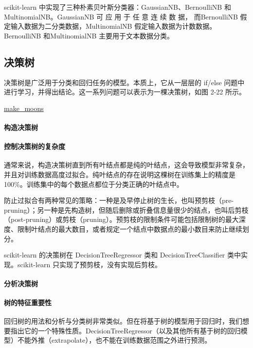 scikit-learn 中实现了三种朴素贝叶斯分类器：GaussianNB、BernoulliNB 和 MultinomialNB。GaussianNB 可 应 用 于 任 意 连 续 数 据， 而BernoulliNB 假定输入数据为二分类数据，MultinomialNB 假定输入数据为计数数据。BernoulliNB 和MultinomialNB 主要用于文本数据分类。

\subsection{决策树}
决策树是广泛用于分类和回归任务的模型。本质上，它从一层层的 if/else 问题中进行学习，并得出结论。这一系列问题可以表示为一棵决策树，如图 2-22 所示。

\href{https://scikit-learn.org/stable/modules/generated/sklearn.datasets.make_moons.html}{make\_moons}

\paragraph{构造决策树}

\paragraph{控制决策树的复杂度} 通常来说，构造决策树直到所有叶结点都是纯的叶结点，这会导致模型非常复杂，并且对训练数据高度过拟合。纯叶结点的存在说明这棵树在训练集上的精度是 100\%。训练集中的每个数据点都位于分类正确的叶结点中。

防止过拟合有两种常见的策略：一种是及早停止树的生长，也叫预剪枝（pre-pruning）；另一种是先构造树，但随后删除或折叠信息量很少的结点，也叫后剪枝（post-pruning）或剪枝（pruning）。预剪枝的限制条件可能包括限制树的最大深度、限制叶结点的最大数目，或者规定一个结点中数据点的最小数目来防止继续划分。

scikit-learn 的决策树在 DecisionTreeRegressor 类和 DecisionTreeClassifier 类中实现。scikit-learn 只实现了预剪枝，没有实现后剪枝。

\paragraph{分析决策树}

\paragraph{树的特征重要性}

回归树的用法和分析与分类树非常类似。但在将基于树的模型用于回归时，我们想要指出它的一个特殊性质。DecisionTreeRegressor（以及其他所有基于树的回归模型）不能外推（extrapolate），也不能在训练数据范围之外进行预测。

